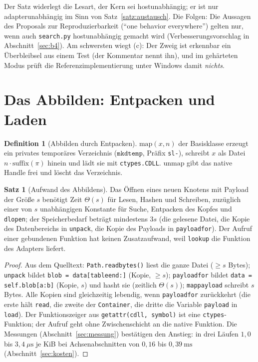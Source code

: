 \documentclass[a4paper,12pt,twoside]{report}
\DeclareRobustCommand{\_}{\ifmmode\mbox{\textunderscore}\else\textunderscore\allowbreak{}\fi}
\theoremstyle{definition}
\newtheorem{definition}{Definition}[chapter]
\newtheorem{satz}{Satz}[chapter]
\begin{document}
Der Satz widerlegt die Lesart, der Kern sei hostunabhängig; er ist nur adapterunabhängig im Sinn von Satz~\ref{satz:austausch}. Die Folgen: Die Aussagen des Proposals zur Reproduzierbarkeit (``one behavior everywhere'') gelten nur, wenn auch \texttt{search.py} hostunabhängig gemacht wird (Verbesserungsvorschlag in Abschnitt~\ref{sec:b4}). Am schwersten wiegt (c): Der Zweig ist erkennbar ein Überbleibsel aus einem Test (der Kommentar nennt ihn), und im gehärteten Modus prüft die Referenzimplementierung unter Windows damit \emph{nichts}.

\section{Das Abbilden: Entpacken und Laden}

\begin{definition}[Abbilden durch Entpacken]
	$\mathrm{map}(x,n)$ der Basisklasse erzeugt ein privates temporäres Verzeichnis ($\texttt{mkdtemp}$, Präfix \texttt{sl-}), schreibt $x$ als Datei $n\cdot\mathrm{suffix}(\pi)$ hinein und lädt sie mit \texttt{ctypes.CDLL}. $\mathrm{unmap}$ gibt das native Handle frei und löscht das Verzeichnis.
\end{definition}

\begin{satz}[Aufwand des Abbildens]
	\label{satz:aufwand}
	Das Öffnen eines neuen Knotens mit Payload der Größe $s$ benötigt Zeit $\Theta(s)$ für Lesen, Hashen und Schreiben, zuzüglich einer von $s$ unabhängigen Konstante für Suche, Entpacken des Kopfes und \texttt{dlopen}; der Speicherbedarf beträgt mindestens $3s$ (die gelesene Datei, die Kopie des Datenbereichs in \texttt{unpack}, die Kopie des Payloads in \texttt{payload\_for}). Der Aufruf einer gebundenen Funktion hat keinen Zusatzaufwand, weil \texttt{lookup} die Funktion des Adapters liefert.
\end{satz}

\begin{proof}
	Aus dem Quelltext: \texttt{Path.read\_bytes()} liest die ganze Datei ($\ge s$ Bytes); \texttt{unpack} bildet \texttt{blob = data[table\_end:]} (Kopie, $\ge s$); \texttt{payload\_for} bildet \texttt{data = self.\_blob[a:b]} (Kopie, $s$) und hasht sie (zeitlich $\Theta(s)$); \texttt{map\_payload} schreibt $s$ Bytes. Alle Kopien sind gleichzeitig lebendig, wenn \texttt{payload\_for} zurückkehrt (die erste hält \texttt{\_read}, die zweite der \texttt{Container}, die dritte die Variable \texttt{payload} in \texttt{\_load}). Der Funktionszeiger aus \texttt{getattr(cdll, symbol)} ist eine \texttt{ctypes}-Funktion; der Aufruf geht ohne Zwischenschicht an die native Funktion. Die Messungen (Abschnitt~\ref{sec:messung}) bestätigen den Anstieg: in drei Läufen $1{,}0$ bis $3{,}4\ \mu\mathrm{s}$ je KiB bei Achsenabschnitten von $0{,}16$ bis $0{,}39\ \mathrm{ms}$ (Abschnitt~\ref{sec:kosten}).
\end{proof}
\end{document}
